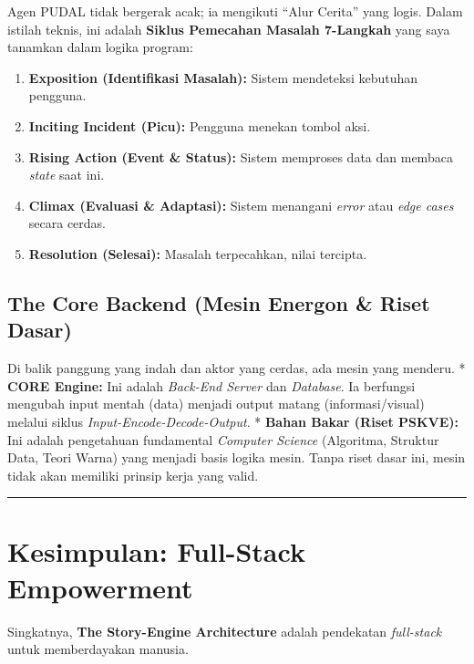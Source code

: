 \documentclass[
  letterpaper,
  DIV=11,
  numbers=noendperiod]{scrreprt}
\providecommand{\tightlist}{%
  \setlength{\itemsep}{0pt}\setlength{\parskip}{0pt}}
\begin{document}
Agen PUDAL tidak bergerak acak; ia mengikuti ``Alur Cerita'' yang logis.
Dalam istilah teknis, ini adalah \textbf{Siklus Pemecahan Masalah
7-Langkah} yang saya tanamkan dalam logika program:

\begin{enumerate}
\def\labelenumi{\arabic{enumi}.}
\tightlist
\item
  \textbf{Exposition (Identifikasi Masalah):} Sistem mendeteksi
  kebutuhan pengguna.
\item
  \textbf{Inciting Incident (Picu):} Pengguna menekan tombol aksi.
\item
  \textbf{Rising Action (Event \& Status):} Sistem memproses data dan
  membaca \emph{state} saat ini.
\item
  \textbf{Climax (Evaluasi \& Adaptasi):} Sistem menangani \emph{error}
  atau \emph{edge cases} secara cerdas.
\item
  \textbf{Resolution (Selesai):} Masalah terpecahkan, nilai tercipta.
\end{enumerate}

\subsection{The Core Backend (Mesin Energon \& Riset
Dasar)}\label{the-core-backend-mesin-energon-riset-dasar}

Di balik panggung yang indah dan aktor yang cerdas, ada mesin yang
menderu. * \textbf{CORE Engine:} Ini adalah \emph{Back-End Server} dan
\emph{Database}. Ia berfungsi mengubah input mentah (data) menjadi
output matang (informasi/visual) melalui siklus
\emph{Input-Encode-Decode-Output}. * \textbf{Bahan Bakar (Riset PSKVE):}
Ini adalah pengetahuan fundamental \emph{Computer Science} (Algoritma,
Struktur Data, Teori Warna) yang menjadi basis logika mesin. Tanpa riset
dasar ini, mesin tidak akan memiliki prinsip kerja yang valid.

\begin{center}\rule{0.5\linewidth}{0.5pt}\end{center}

\section{Kesimpulan: Full-Stack
Empowerment}\label{kesimpulan-full-stack-empowerment}

Singkatnya, \textbf{The Story-Engine Architecture} adalah pendekatan
\emph{full-stack} untuk memberdayakan manusia.
\end{document}
